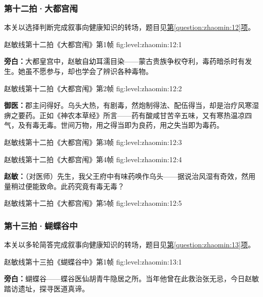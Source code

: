 \subsubsection{第十二拍·大都宫闱}\label{plot:zhaomin:12}
本关以选择判断完成叙事向健康知识的转场，题目见\hyperref[question:zhaomin:12]{第\ref*{question:zhaomin:12}项}。

  {赵敏线第十二拍《大都宫闱》第1帧}
  {fig:level:zhaomin:12:1}
  {\scriptsize}
  {\textbf{旁白：}大都皇宫中，赵敏自幼耳濡目染——蒙古贵族争权夺利，毒药暗杀时有发生。她虽不愿参与，却也学会了辨识各种毒物。\par}

  {赵敏线第十二拍《大都宫闱》第2帧}
  {fig:level:zhaomin:12:2}
  {\scriptsize}
  {\textbf{御医：}郡主问得好。乌头大热，有剧毒，然炮制得法、配伍得当，却是治疗风寒湿痹之要药。正如《神农本草经》所言——药有酸咸甘苦辛五味，又有寒热温凉四气，及有毒无毒。世间万物，用之得当即为良药，用之失当即为毒药。\par}

\clearpage

  {赵敏线第十二拍《大都宫闱》第3帧}
  {fig:level:zhaomin:12:3}
  {\scriptsize}
  {\mbox{}}

  {赵敏线第十二拍《大都宫闱》第4帧}
  {fig:level:zhaomin:12:4}
  {\scriptsize}
  {\textbf{赵敏：}（对医师）先生，我父王府中有味药唤作乌头——据说治风湿有奇效，然用量稍过便能致命。此药究竟有毒无毒？\par}

  {赵敏线第十二拍《大都宫闱》第5帧}
  {fig:level:zhaomin:12:5}
  {\scriptsize}
  {\mbox{}}

\clearpage

\subsubsection{第十三拍·蝴蝶谷中}\label{plot:zhaomin:13}
本关以多轮简答完成叙事向健康知识的转场，题目见\hyperref[question:zhaomin:13]{第\ref*{question:zhaomin:13}项}。

  {赵敏线第十三拍《蝴蝶谷中》第1帧}
  {fig:level:zhaomin:13:1}
  {\scriptsize}
  {\textbf{旁白：}蝴蝶谷——蝶谷医仙胡青牛隐居之所。当年他曾在此救治张无忌，今日赵敏踏访遗址，探寻医道真谛。\par}

